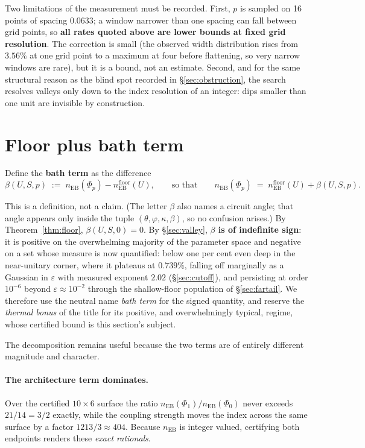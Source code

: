 \documentclass[11pt,a4paper]{article}
\theoremstyle{definition}
\theoremstyle{remark}
\newcommand{\nEB}{n_{\mathrm{EB}}}
\newcommand{\floor}{n_{\mathrm{EB}}^{\mathrm{floor}}}
\begin{document}
Two limitations of the measurement must be recorded. First, $p$ is sampled on 16 points of spacing $0.0633$; a window narrower than one spacing can fall between grid points, so \textbf{all rates quoted above are lower bounds at fixed grid resolution}. The correction is small (the observed width distribution rises from $3.56\%$ at one grid point to a maximum at four before flattening, so very narrow windows are rare), but it is a bound, not an estimate. Second, and for the same structural reason as the blind spot recorded in \S\ref{sec:obstruction}, the search resolves valleys only down to the index resolution of an integer: dips smaller than one unit are invisible by construction.

\section{Floor plus bath term}\label{sec:bathterm}

Define the \textbf{bath term} as the difference
\begin{equation}\label{eq:bathterm}
  \beta(U,S,p) \;:=\; \nEB(\Phi_p) - \floor(U),
  \qquad\text{so that}\qquad \nEB(\Phi_p) \;=\; \floor(U) + \beta(U,S,p).
\end{equation}

This is a definition, not a claim. (The letter $\beta$ also names a circuit angle; that angle appears only inside the tuple $(\theta,\varphi,\kappa,\beta)$, so no confusion arises.) By Theorem~\ref{thm:floor}, $\beta(U,S,0) = 0$. By \S\ref{sec:valley}, \textbf{$\beta$ is of indefinite sign}: it is positive on the overwhelming majority of the parameter space and negative on a set whose measure is now quantified: below one per cent even deep in the near-unitary corner, where it plateaus at $0.739\%$, falling off marginally as a Gaussian in $\varepsilon$ with measured exponent $2.02$ (\S\ref{sec:cutoff}), and persisting at order $10^{-6}$ beyond $\varepsilon\approx10^{-2}$ through the shallow-floor population of \S\ref{sec:fartail}. We therefore use the neutral name \emph{bath term} for the signed quantity, and reserve the \emph{thermal bonus} of the title for its positive, and overwhelmingly typical, regime, whose certified bound is this section's subject.

The decomposition remains useful because the two terms are of entirely different magnitude and character.

\paragraph{The architecture term dominates.} Over the certified $10\times6$ surface the ratio
$\nEB(\Phi_1)/\nEB(\Phi_0)$ never exceeds $21/14 = 3/2$ exactly, while the coupling strength moves
the index across the same surface by a factor $1213/3 \approx 404$. Because $\nEB$ is integer
valued, certifying both endpoints renders these \emph{exact rationals}.
\end{document}
